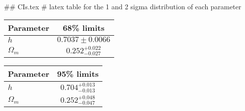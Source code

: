 ## CIs.tex
# latex table for the 1 and 2 sigma distribution of each parameter

\begin{tabular} { l  c}
 Parameter &  68\% limits\\
\hline
{\boldmath$h              $} & $0.7037\pm 0.0066          $\\
{\boldmath$\Omega_m       $} & $0.252^{+0.022}_{-0.027}   $\\
\hline
\end{tabular}

\begin{tabular} { l  c}
 Parameter &  95\% limits\\
\hline
{\boldmath$h              $} & $0.704^{+0.013}_{-0.013}   $\\
{\boldmath$\Omega_m       $} & $0.252^{+0.048}_{-0.047}   $\\
\hline
\end{tabular}
